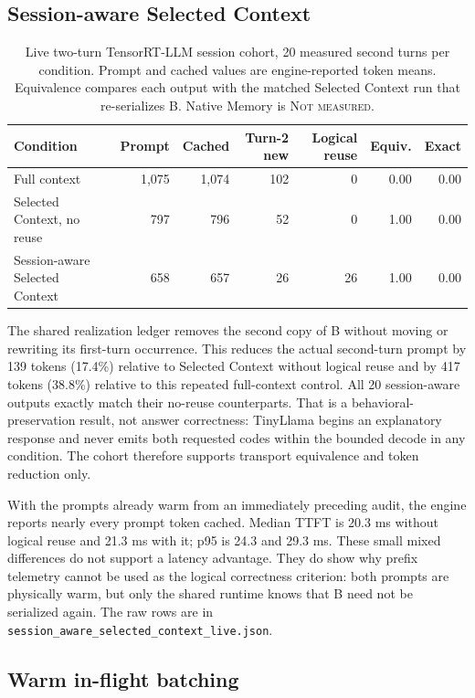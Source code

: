 \documentclass[10pt]{article}
\begin{document}
\subsection{Session-aware Selected Context}
\begin{table}[ht]
\centering
\scriptsize
\caption{Live two-turn TensorRT-LLM session cohort, 20 measured second turns
per condition. Prompt and cached values are engine-reported token means.
Equivalence compares each output with the matched Selected Context run that
re-serializes B. Native Memory is \textsc{Not measured}.}
\label{tab:trt-session-aware}
\begin{tabular}{lrrrrrr}
\toprule
Condition & Prompt & Cached & Turn-2 new & Logical reuse & Equiv. & Exact \\
\midrule
Full context & 1,075 & 1,074 & 102 & 0 & 0.00 & 0.00 \\
Selected Context, no reuse & 797 & 796 & 52 & 0 & 1.00 & 0.00 \\
Session-aware Selected Context & 658 & 657 & 26 & 26 & 1.00 & 0.00 \\
\bottomrule
\end{tabular}
\end{table}

The shared realization ledger removes the second copy of B without moving or
rewriting its first-turn occurrence. This reduces the actual second-turn prompt
by 139 tokens (17.4\%) relative to Selected Context without logical reuse and
by 417 tokens (38.8\%) relative to this repeated full-context control. All
20 session-aware outputs exactly match their no-reuse counterparts. That is a
behavioral-preservation result, not answer correctness: TinyLlama begins an
explanatory response and never emits both requested codes within the bounded
decode in any condition. The cohort therefore supports transport equivalence
and token reduction only.

With the prompts already warm from an immediately preceding audit, the engine
reports nearly every prompt token cached. Median TTFT is 20.3 ms without logical
reuse and 21.3 ms with it; p95 is 24.3 and 29.3 ms. These small mixed differences
do not support a latency advantage. They do show why prefix telemetry cannot be
used as the logical correctness criterion: both prompts are physically warm,
but only the shared runtime knows that B need not be serialized again. The raw
rows are in \texttt{session\_aware\_selected\_context\_live.json}.

\subsection{Warm in-flight batching}
\begin{table}[ht]
\centering
\caption{Warm E0 concurrency endpoints. Every row has controlled answer
success 1.00. Cached is the engine-reported mean cached-token count.}

\end{table}
\end{document}

